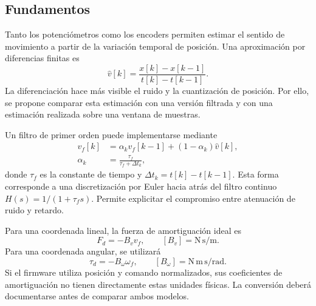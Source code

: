 \documentclass[11pt,a4paper]{article}
\begin{document}
\subsection{Fundamentos}
Tanto los potenciómetros como los encoders permiten estimar el sentido de
movimiento a partir de la variación temporal de posición. Una aproximación
por diferencias finitas es
\begin{equation}
    \widehat v[k]=\frac{x[k]-x[k-1]}{t[k]-t[k-1]}.
\end{equation}
La diferenciación hace más visible el ruido y la cuantización de posición.
Por ello, se propone comparar esta estimación con una versión filtrada y
con una estimación realizada sobre una ventana de muestras.

Un filtro de primer orden puede implementarse mediante
\begin{align}
    v_f[k]&=\alpha_k v_f[k-1]+(1-\alpha_k)\widehat v[k],\\
    \alpha_k&=\frac{\tau_f}{\tau_f+\Delta t_k},
\end{align}
donde $\tau_f$ es la constante de tiempo y $\Delta t_k=t[k]-t[k-1]$.
Esta forma corresponde a una discretización por Euler hacia atrás del
filtro continuo $H(s)=1/(1+\tau_f s)$. Permite explicitar el compromiso entre
atenuación de ruido y retardo.

Para una coordenada lineal, la fuerza de amortiguación ideal es
\begin{equation}
    F_d=-B_v v_f,
    \qquad [B_v]=\mathrm{N\,s/m}.
\end{equation}
Para una coordenada angular, se utilizará
\begin{equation}
    \tau_d=-B_\omega\omega_f,
    \qquad [B_\omega]=\mathrm{N\,m\,s/rad}.
\end{equation}
Si el firmware utiliza posición y comando normalizados, sus coeficientes
de amortiguación no tienen directamente estas unidades físicas. La
conversión deberá documentarse antes de comparar ambos modelos.
\end{document}
